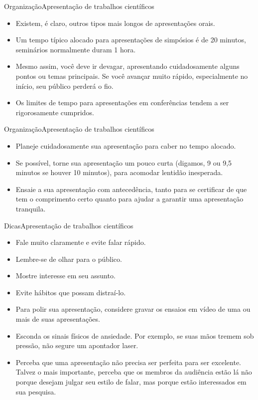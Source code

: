\documentclass[t]{beamer}
\begin{document}
\begin{ftst}{Organização}{Apresentação de trabalhos científicos}
\begin{itemize}
    \item Existem, é claro, outros tipos mais longos de apresentações orais. 
    \item Um tempo típico alocado para apresentações de simpósios é de 20 minutos, seminários normalmente duram 1 hora. 
    \item Mesmo assim, você deve ir devagar, apresentando cuidadosamente alguns pontos ou temas principais. Se você avançar muito rápido, especialmente no início, seu público perderá o fio. 
    \item Os limites de tempo para apresentações em conferências tendem a ser rigorosamente cumpridos.
\end{itemize}
\end{ftst}


\begin{ftst}{Organização}{Apresentação de trabalhos científicos}
\begin{itemize}
    \item Planeje cuidadosamente sua apresentação para caber no tempo alocado. 
    \item Se possível, torne sua apresentação um pouco curta (digamos, 9 ou 9,5 minutos se houver 10 minutos), para acomodar lentidão inesperada. 
    \item Ensaie a sua apresentação com antecedência, tanto para se certificar de que tem o comprimento certo quanto para ajudar a garantir uma apresentação tranquila. 
\end{itemize}
\end{ftst}


\begin{ftst}{Dicas}{Apresentação de trabalhos científicos}
\begin{itemize}
    \item Fale muito claramente e evite falar rápido.
    \item Lembre-se de olhar para o público. 
    \item Mostre interesse em seu assunto. 
    \item Evite hábitos que possam distraí-lo.
    \item Para polir sua apresentação, considere gravar os ensaios em vídeo de uma ou mais de suas apresentações. 
    \item Esconda os sinais físicos de ansiedade. Por exemplo, se suas mãos tremem sob pressão, não segure um apontador laser. 
    \item Perceba que uma apresentação não precisa ser perfeita para ser excelente. Talvez o mais importante, perceba que os membros da audiência estão lá não porque desejam julgar seu estilo de falar, mas porque estão interessados em sua pesquisa.
\end{itemize}
\end{ftst}
\end{document}

